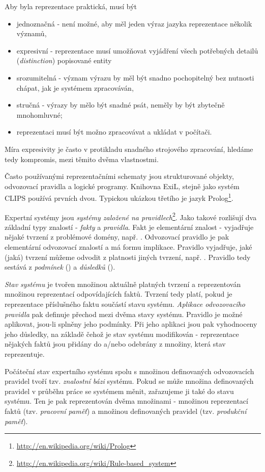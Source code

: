 Aby byla reprezentace praktická, musí být
\begin{itemize}
  \item jednoznačná - není možné, aby měl jeden výraz jazyka reprezentace
    několik významů,
  \item expresivní - reprezentace musí umožňovat vyjádření všech potřebných
    detailů (\emph{distinction}) popisované entity
  \item srozumitelná - význam výrazu by měl být snadno pochopitelný bez
    nutnosti chápat, jak je systémem zpracováván,
  \item stručná - výrazy by mělo být snadné psát, neměly by být zbytečně
    mnohomluvné;
  \item reprezentaci musí být možno zpracovávat a ukládat v počítači.
\end{itemize}
Míra expresivity je často v protikladu snadného strojového zpracování, hledáme
tedy kompromis, mezi těmito dvěma vlastnostmi.

Často používanými reprezentačními schematy jsou strukturované objekty,
odvozovací pravidla a logické programy. Knihovna ExiL, stejně jako systém CLIPS
používá prvních dvou. Typickou ukázkou třetího je jazyk
Prolog\footnote{\url{http://en.wikipedia.org/wiki/Prolog}}.

Expertní systémy jsou \emph{systémy založené na
pravidlech}\footnote{\url{http://en.wikipedia.org/wiki/Rule-based\_system}}.
Jako takové rozlišují dva základní typy znalostí - \emph{fakty} a
\emph{pravidla}. Fakt je elementární  znalost - vyjadřuje nějaké
tvrzení z problémové domény, např. . Odvozovací pravidlo je
pak elementární odvozovací znalostí a má formu implikace. Pravidlo vyjadřuje,
jaké (jaká) tvrzení můžeme odvodit z platnosti jiných tvrzení, např. . Pravidlo tedy sestává z \emph{podmínek} () a \emph{důsledků} ().

\emph{Stav systému} je tvořen množinou aktuálně platných tvrzení a reprezentován
množinou reprezentací odpovídajících faktů. Tvrzení tedy platí, pokud je
reprezentace příslušného faktu součástí stavu systému. \emph{Aplikace
odvozovacího pravidla} pak definuje přechod mezi dvěma stavy systému. Pravidlo
je možné aplikovat, jsou-li splněny jeho podmínky. Při jeho aplikaci jsou pak
vyhodnoceny jeho důsledky, na základě čehož je stav systému modifikován -
reprezentace nějakých faktů jsou přidány do a/nebo odebrány z množiny, která
stav reprezentuje.

Počáteční stav expertního systému spolu s množinou definovaných odvozovacích
pravidel tvoří tzv. \emph{znalostní bázi} systému. Pokud se může množina
definovaných pravidel v průběhu práce se systémem měnit, zařazujeme ji také do
stavu systému. Ten je pak reprezentován dvěma množinami - množinou reprezentací
faktů (tzv. \emph{pracovní paměť}) a množinou definovaných pravidel (tzv.
\emph{produkční paměť}).

